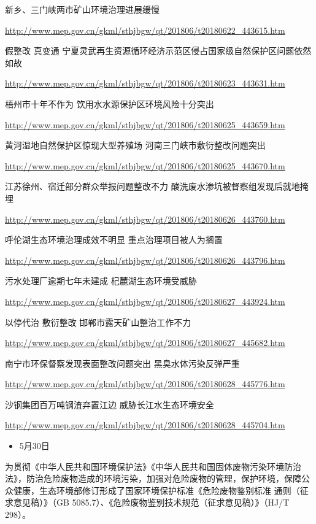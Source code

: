 \documentclass[
]{book}
\providecommand{\tightlist}{%
  \setlength{\itemsep}{0pt}\setlength{\parskip}{0pt}}
\begin{document}
新乡、三门峡两市矿山环境治理进展缓慢

\url{http://www.mep.gov.cn/gkml/sthjbgw/qt/201806/t20180622_443615.htm}

假整改 真变通 宁夏灵武再生资源循环经济示范区侵占国家级自然保护区问题依然如故

\url{http://www.mep.gov.cn/gkml/sthjbgw/qt/201806/t20180623_443631.htm}

梧州市十年不作为 饮用水水源保护区环境风险十分突出

\url{http://www.mep.gov.cn/gkml/sthjbgw/qt/201806/t20180625_443659.htm}

黄河湿地自然保护区惊现大型养殖场 河南三门峡市敷衍整改问题突出

\url{http://www.mep.gov.cn/gkml/sthjbgw/qt/201806/t20180625_443670.htm}

江苏徐州、宿迁部分群众举报问题整改不力 酸洗废水渗坑被督察组发现后就地掩埋

\url{http://www.mep.gov.cn/gkml/sthjbgw/qt/201806/t20180626_443760.htm}

呼伦湖生态环境治理成效不明显 重点治理项目被人为搁置

\url{http://www.mep.gov.cn/gkml/sthjbgw/qt/201806/t20180626_443796.htm}

污水处理厂逾期七年未建成 杞麓湖生态环境受威胁

\url{http://www.mep.gov.cn/gkml/sthjbgw/qt/201806/t20180627_443924.htm}

以停代治 敷衍整改 邯郸市露天矿山整治工作不力

\url{http://www.mep.gov.cn/gkml/sthjbgw/qt/201806/t20180627_445682.htm}

南宁市环保督察发现表面整改问题突出 黑臭水体污染反弹严重

\url{http://www.mep.gov.cn/gkml/sthjbgw/qt/201806/t20180628_445776.htm}

沙钢集团百万吨钢渣弃置江边 威胁长江水生态环境安全

\url{http://www.mep.gov.cn/gkml/sthjbgw/qt/201806/t20180628_445704.htm}

\begin{itemize}
\tightlist
\item
  5月30日
\end{itemize}

为贯彻《中华人民共和国环境保护法》《中华人民共和国固体废物污染环境防治法》，防治危险废物造成的环境污染，加强对危险废物的管理，保护环境，保障公众健康，生态环境部修订形成了国家环境保护标准《危险废物鉴别标准 通则（征求意见稿）》（GB 5085.7）、《危险废物鉴别技术规范（征求意见稿）》（HJ/T 298）。
\end{document}
